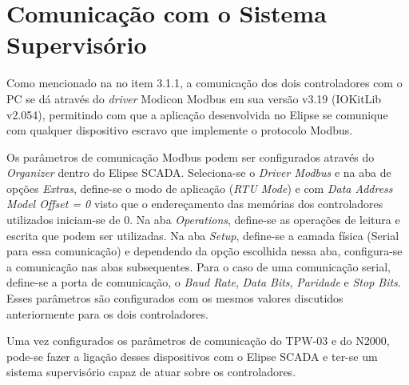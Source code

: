 \section{Comunicação com o Sistema Supervisório}

Como mencionado na no item 3.1.1, a comunicação dos dois controladores com o PC se dá através do \textit{driver} Modicon Modbus em sua versão v3.19 (IOKitLib v2.054), permitindo com que a aplicação desenvolvida no Elipse se comunique com qualquer dispositivo escravo que implemente o protocolo Modbus.

Os parâmetros de comunicação Modbus podem ser configurados através do \textit{Organizer} dentro do Elipse SCADA. Seleciona-se o \textit{Driver Modbus} e na aba de opções \textit{Extras}, define-se o modo de aplicação (\textit{RTU Mode}) e com \textit{Data Address Model Offset = 0} visto que o endereçamento das memórias dos controladores utilizados iniciam-se de 0. Na aba \textit{Operations}, define-se as operações de leitura e escrita que podem ser utilizadas. Na aba \textit{Setup}, define-se a camada física (Serial para essa comunicação) e dependendo da opção escolhida nessa aba, configura-se a comunicação nas abas subsequentes. Para o caso de uma comunicação serial, define-se a porta de comunicação, o \textit{Baud Rate}, \textit{Data Bits}, \textit{Paridade} e \textit{Stop Bits}. Esses parâmetros são configurados com os mesmos valores discutidos anteriormente para os dois controladores.

Uma vez configurados os parâmetros de comunicação do TPW-03 e do N2000, pode-se fazer a ligação desses dispositivos com o Elipse SCADA e ter-se um sistema supervisório capaz de atuar sobre os controladores.

































